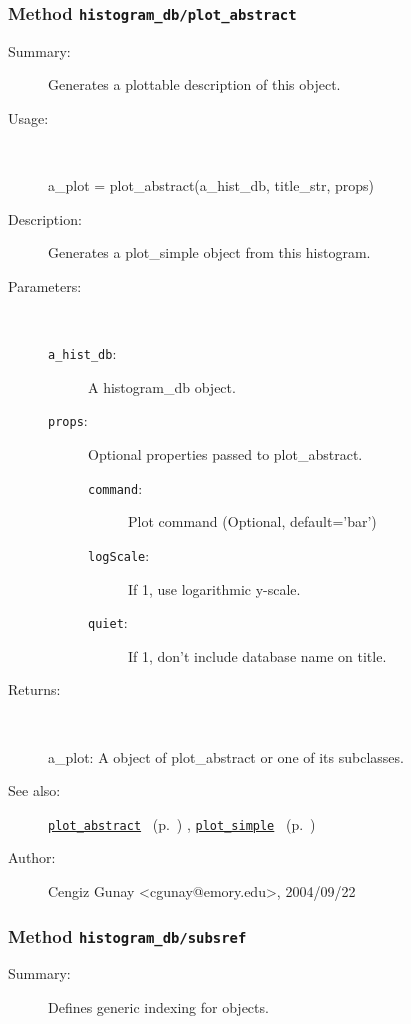 \subsubsection[Method \texttt{plot\_abstract}]{Method \texttt{histogram\_db/plot\_abstract}}%
%
\label{ref_histogram_db__plot_abstract}%
\hypertarget{ref_histogram_db__plot_abstract}{}%
\begin{description}
\item[Summary:]Generates a plottable description of this object.
%
\item[Usage:]~%
\begin{lyxcode}%
a\_plot = plot\_abstract(a\_hist\_db, title\_str, props)
%
\end{lyxcode}%
%
\item[Description:]%
Generates a plot\_simple object from this histogram.
\item[Parameters:]~
\begin{description}%
\item[\texttt{a\_hist\_db}:]
 A histogram\_db object.
\item[\texttt{props}:]
 Optional properties passed to plot\_abstract.
\begin{description}%
\item[\texttt{command}:]
 Plot command (Optional, default='bar')
\item[\texttt{logScale}:]
 If 1, use logarithmic y-scale.
\item[\texttt{quiet}:]
 If 1, don't include database name on title.
\end{description}%
\end{description}%
%
\item[Returns:]~

	a\_plot: A object of plot\_abstract or one of its subclasses.
%
%
\item[See also:]%
\hyperlink{ref_plot_abstract}{\texttt{plot\_abstract}}%
\ (p.~\pageref{ref_plot_abstract})%
%
, \hyperlink{ref_plot_simple}{\texttt{plot\_simple}}%
\ (p.~\pageref{ref_plot_simple})%
%
%
\item[Author:]%
Cengiz Gunay <cgunay@emory.edu>, 2004/09/22%
\end{description}
\methodline%
\subsubsection[Method \texttt{subsref}]{Method \texttt{histogram\_db/subsref}}%
%
\label{ref_histogram_db__subsref}%
\hypertarget{ref_histogram_db__subsref}{}%
\begin{description}
\item[Summary:]Defines generic indexing for objects.
%
%
%
%
%
%
%
%
\end{description}
\methodline%
